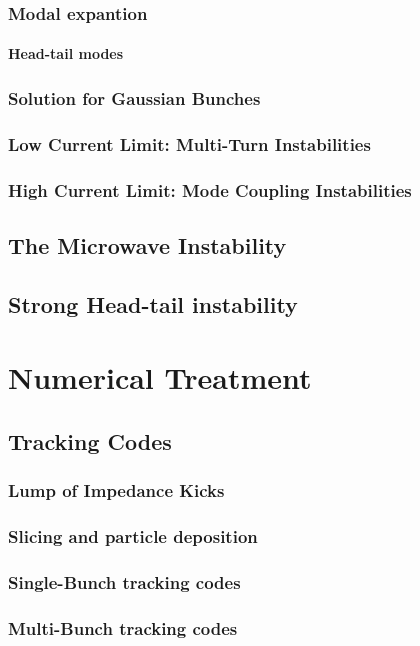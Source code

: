 \documentclass[
	12pt,				%
	openright,			%
	oneside,			%
	a4paper,		%
	chapter=TITLE,		%
	section=TITLE,		%
    brazil,				%
	english,			%
	sumario=tradicional,
	]{abntex2}
\begin{document}
      \subsubsection{Modal expantion}
        \paragraph{Head-tail modes}
      \subsubsection{Solution for Gaussian Bunches}
      \subsubsection{Low Current Limit: Multi-Turn Instabilities}
      \subsubsection{High Current Limit: Mode Coupling Instabilities}
    \subsection{The Microwave Instability}
    \subsection{Strong Head-tail instability}
  \section{Numerical Treatment}
    \subsection{Tracking Codes}
      \subsubsection{Lump of Impedance Kicks}
      \subsubsection{Slicing and particle deposition}
      \subsubsection{Single-Bunch tracking codes}
      \subsubsection{Multi-Bunch tracking codes}
\end{document}
